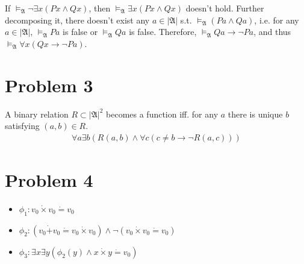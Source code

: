\documentclass{article}
\begin{document}
If $\vDash_{\mathfrak{A}} \neg \exists x (Px \land Qx)$, then $\vDash_{\mathfrak{A}} \exists x (Px \land Qx)$ doesn't hold. Further decomposing it, there doesn't exist any $a\in|\mathfrak{A}|$ s.t. $\vDash_{\mathfrak{A}} (Pa \land Qa)$, i.e. for any $a\in|\mathfrak{A}|$, $\vDash_{\mathfrak{A}} Pa$ is false or $\vDash_{\mathfrak{A}} Qa$ is false. Therefore, $\vDash_{\mathfrak{A}} Qa \to \neg Pa$, and thus $\vDash_{\mathfrak{A}} \forall x (Qx \to \neg Pa)$.



\section*{Problem 3}

A binary relation $R \subset |\mathfrak{A}|^2$ becomes a function iff. for any $a$ there is unique $b$ satisfying $(a,b)\in R$.
\begin{align*}
	\forall a \exists b (R(a,b) \land \forall c (c\ne b \to \neg R(a,c)))
\end{align*}



\section*{Problem 4}

\begin{itemize}
\item
$\phi_1: v_0 \dot\times v_0 \dot= v_0$
\item
$\phi_2: (v_0 \dot+ v_0 \dot= v_0 \dot\times v_0) \land \neg(v_0 \dot\times v_0 \dot= v_0)$
\item
$\phi_3: \exists x \exists y (\phi_2(y) \land x\dot\times y \dot=v_0)$
\end{itemize}
\end{document}
